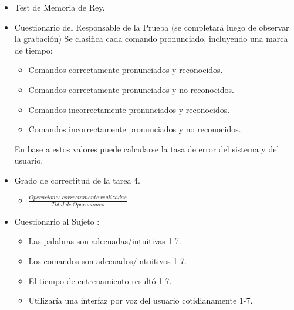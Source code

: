\begin{itemize}
    \item Test de Memoria de Rey.
    \item Cuestionario del Responsable de la Prueba (se completar\'a luego de observar la grabaci\'on)
    Se clasifica cada comando pronunciado, incluyendo una marca de tiempo:
    \begin{itemize}
        \item Comandos correctamente pronunciados y reconocidos.
        \item Comandos correctamente pronunciados y no reconocidos.
        \item Comandos incorrectamente pronunciados y reconocidos.
        \item Comandos incorrectamente pronunciados y no reconocidos.
    \end{itemize}
    En base a estos valores puede calcularse la tasa de error del sistema y del usuario.
    \item Grado de correctitud de la tarea 4.
    \begin{itemize}
    \item $ \frac{Operaciones \:correctamente \:realizadas}{Total \:de \:Operaciones}$
    \end{itemize}
    \item Cuestionario al Sujeto :
    \begin{itemize}
        \item Las palabras son adecuadas/intuitivas 1-7.
        \item Los comandos son adecuados/intuitivos 1-7.
        \item El tiempo de entrenamiento result\'o 1-7.
        \item Utilizaría una interfaz por voz del usuario cotidianamente 1-7.
    \end{itemize}
\end{itemize}

